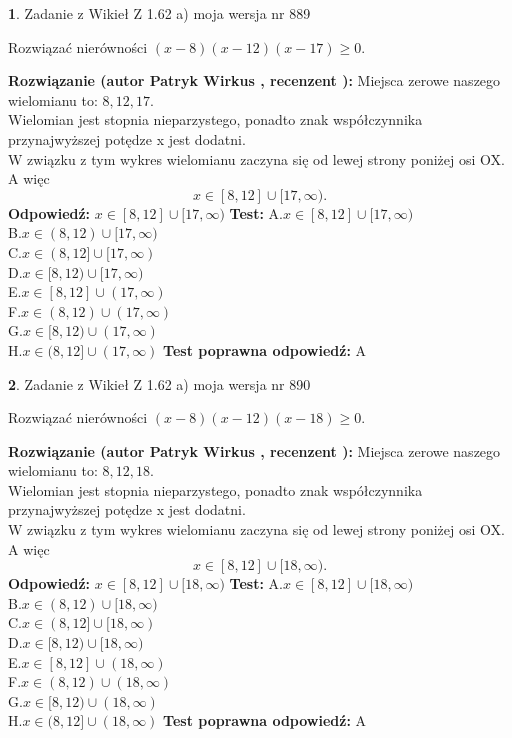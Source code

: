\documentclass[12pt, a4paper]{article}
\theoremstyle{definition} %
\newtheorem{zad}{}
\newcommand{\zadStart}[1]{\begin{zad}#1\newline}
\newcommand{\zadStop}{\end{zad}}
\newcommand{\rozwStart}[2]{\noindent \textbf{Rozwiązanie (autor #1 , recenzent #2): }\newline}
\newcommand{\rozwStop}{\newline}
\newcommand{\odpStart}{\noindent \textbf{Odpowiedź:}\newline}
\newcommand{\odpStop}{\newline}
\newcommand{\testStart}{\noindent \textbf{Test:}\newline}
\newcommand{\testStop}{\newline}
\newcommand{\kluczStart}{\noindent \textbf{Test poprawna odpowiedź:}\newline}
\newcommand{\kluczStop}{\newline}
\begin{document}
\zadStart{Zadanie z Wikieł Z 1.62 a) moja wersja nr 889}

Rozwiązać nierówności $(x-8)(x-12)(x-17)\ge0$.
\zadStop
\rozwStart{Patryk Wirkus}{}
Miejsca zerowe naszego wielomianu to: $8, 12, 17$.\\
Wielomian jest stopnia nieparzystego, ponadto znak współczynnika przy\linebreak najwyższej potędze x jest dodatni.\\ W związku z tym wykres wielomianu zaczyna się od lewej strony poniżej osi OX. A więc $$x \in [8,12] \cup [17,\infty).$$
\rozwStop
\odpStart
$x \in [8,12] \cup [17,\infty)$
\odpStop
\testStart
A.$x \in [8,12] \cup [17,\infty)$\\
B.$x \in (8,12) \cup [17,\infty)$\\
C.$x \in (8,12] \cup [17,\infty)$\\
D.$x \in [8,12) \cup [17,\infty)$\\
E.$x \in [8,12] \cup (17,\infty)$\\
F.$x \in (8,12) \cup (17,\infty)$\\
G.$x \in [8,12) \cup (17,\infty)$\\
H.$x \in (8,12] \cup (17,\infty)$
\testStop
\kluczStart
A
\kluczStop



\zadStart{Zadanie z Wikieł Z 1.62 a) moja wersja nr 890}

Rozwiązać nierówności $(x-8)(x-12)(x-18)\ge0$.
\zadStop
\rozwStart{Patryk Wirkus}{}
Miejsca zerowe naszego wielomianu to: $8, 12, 18$.\\
Wielomian jest stopnia nieparzystego, ponadto znak współczynnika przy\linebreak najwyższej potędze x jest dodatni.\\ W związku z tym wykres wielomianu zaczyna się od lewej strony poniżej osi OX. A więc $$x \in [8,12] \cup [18,\infty).$$
\rozwStop
\odpStart
$x \in [8,12] \cup [18,\infty)$
\odpStop
\testStart
A.$x \in [8,12] \cup [18,\infty)$\\
B.$x \in (8,12) \cup [18,\infty)$\\
C.$x \in (8,12] \cup [18,\infty)$\\
D.$x \in [8,12) \cup [18,\infty)$\\
E.$x \in [8,12] \cup (18,\infty)$\\
F.$x \in (8,12) \cup (18,\infty)$\\
G.$x \in [8,12) \cup (18,\infty)$\\
H.$x \in (8,12] \cup (18,\infty)$
\testStop
\kluczStart
A
\kluczStop
\end{document}

